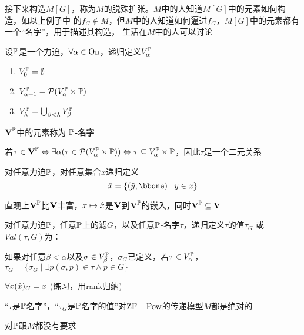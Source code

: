 \documentclass[11pt]{article}
\begin{document}
接下来构造\(M[G]\)，称为\(M\)的脱殊扩张。\(M\)中的人知道\(M[G]\)中的元素如何构造，如以上例子中
的\(f_G\notin M\)，但\(M\)中的人知道如何逼进\(f_G\)，\(M[G]\)中的元素都有一个“名字”，用于描述其构造，
生活在\(M\)中的人可以讨论

\begin{definition}[]
设\(\P\)是一个力迫，\(\forall\alpha\in\On\)，递归定义\(V_\alpha^{\P}\)
\begin{enumerate}
\item \(V_0^{\P}=\emptyset\)
\item \(V_{\alpha+1}^{\P}=\calp(V_\alpha^{\P}\times\P)\)
\item \(V_\lambda^{\P}=\bigcup_{\beta<\lambda}V_\beta^{\P}\)
\end{enumerate}


\(\bV^{\P}\)中的元素称为 \textbf{\(\P\)-名字}
\end{definition}

若\(\tau\in\bV^{\P}\Leftrightarrow\exists\alpha(\tau\in\calp(V_\alpha^{\P}\times\P))\Leftrightarrow\tau\subseteq V_\alpha^{\P}\times\P\)，因此\(\tau\)是一个二元关系

\begin{definition}[]
对任意力迫\(\P\)，对任意集合\(x\)递归定义
\begin{equation*}
\hatx=\{(\haty,\bbone)\mid y\in x\}
\end{equation*}
\end{definition}

直观上\(\bV^{\P}\)比\(\bV\)丰富，\(x\mapsto\hatx\)是\(\bV\)到\(\bV^{\P}\)的嵌入，同时\(\bV^{\P}\subseteq\bV\)


\begin{definition}[]
对任意力迫\(\P\)，任意\(\P\)上的滤\(G\)，以及任意\(\P\)-名字\(\tau\)，递归定义\(\tau\)的值\(\tau_G\)
或\(Val(\tau,G)\)为：

如果对任意\(\beta<\alpha\)以及\(\sigma\in V_\beta^{\P}\)，\(\sigma_G\)已定义，若\(\tau\in V_\alpha^{\P}\)，
\(\tau_G=\{\sigma_G\mid\exists p(\sigma,p)\in\tau\wedge p\in G\}\)
\end{definition}

\(\forall x(\hatx)_G=x\) (练习，用rank归纳)

\begin{lemma}[]
``\(\tau\)是\(\P\)名字''，``\(\tau_G\)是\(\P\)名字的值''对\(\ZF-\Pow\)的传递模型\(M\)都是绝对的
\end{lemma}

对\(\P\)跟\(M\)都没有要求
\end{document}
